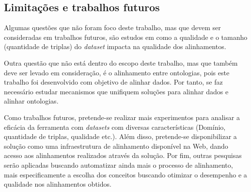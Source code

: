 \subsection{Limitações e trabalhos futuros}

Algumas questões que não foram foco deste trabalho, mas que devem ser consideradas em trabalhos futuros, são estudos em como a qualidade e o tamanho (quantidade de triplas) do \textit{dataset} impacta na qualidade dos alinhamentos.

Outra questão que não está dentro do escopo deste trabalho, mas que também deve ser levado em consideração, é o alinhamento entre ontologias, pois este trabalho foi desenvolvido com objetivo de alinhar dados. Por tanto, se faz necessário estudar mecanismos que unifiquem soluções para alinhar dados e alinhar ontologias.

Como trabalhos futuros, pretende-se realizar mais experimentos para analisar a eficácia da ferramenta com \textit{datasets} com diversas características (Domínio, quantidade de triplas, qualidade etc.). Além disso, pretende-se disponibilizar a solução como uma infraestrutura de alinhamento disponível na Web, dando acesso aos alinhamentos realizados através da solução. Por fim, outras pesquisas serão aplicadas buscando automatizar ainda mais o processo de alinhamento, mais especificamente a escolha dos conceitos buscando otimizar o desempenho e a qualidade nos alinhamentos obtidos.

